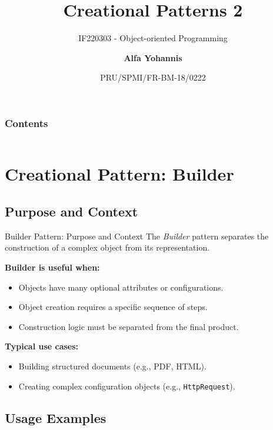 \documentclass[aspectratio=169, table]{beamer}
\subtitle{IF220303 - Object-oriented Programming}
\title{\Huge{Creational Patterns 2}\\\vspace{30pt}}
\date[Serial]{\scriptsize {PRU/SPMI/FR-BM-18/0222}}
\author[Pradita]{\small {\textbf{Alfa Yohannis}}}
\begin{document}
\frame{\titlepage}

\begin{frame}[fragile]
\frametitle{Contents}
\vspace{20pt}
\begin{columns}[t]
\tableofcontents[sections={1-2}]

\tableofcontents[sections={3-4}]
\end{columns}
\end{frame}

\section{Creational Pattern: Builder}

\subsection{Purpose and Context}

\begin{frame}[fragile]{Builder Pattern: Purpose and Context}
\vspace{20pt}
The \textit{Builder} pattern separates the construction of a complex object from its representation.

\vspace{10pt}
\textbf{Builder is useful when:}
\begin{itemize}
\item Objects have many optional attributes or configurations.
\item Object creation requires a specific sequence of steps.
\item Construction logic must be separated from the final product.
\end{itemize}

\vspace{10pt}
\textbf{Typical use cases:}
\begin{itemize}
\item Building structured documents (e.g., PDF, HTML).
\item Creating complex configuration objects (e.g., \texttt{HttpRequest}).
\end{itemize}
\end{frame}

\subsection{Usage Examples}
\end{document}
